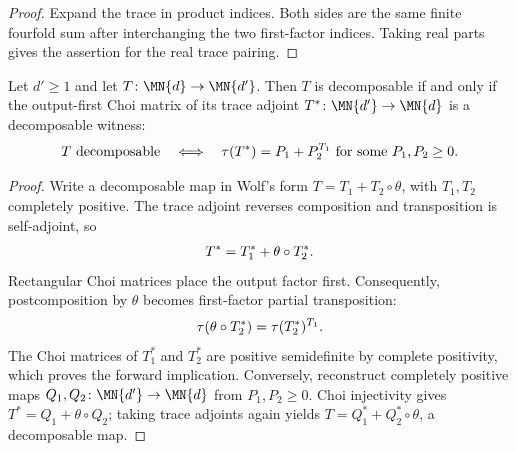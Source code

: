 \begin{proof}
    \leanok
    Expand the trace in product indices.  Both sides are the same finite
    fourfold sum after interchanging the two first-factor indices.  Taking
    real parts gives the assertion for the real trace pairing.
\end{proof}

\begin{theorem}
    \label{thm:decomposable_map_iff_decomposable_witness}
    \leanok
    Let $d'\geq1$ and let $T\colon\MN{d}\to\MN{d'}$. Then $T$ is
    decomposable if and only if the output-first Choi matrix of its trace
    adjoint $T^*\colon\MN{d'}\to\MN{d}$ is a decomposable witness:
    \begin{align}
        T\text{ decomposable}
        \quad\Longleftrightarrow\quad
        \tau(T^*)=P_1+P_2^{T_1}
        \text{ for some }P_1,P_2\geq0.
        \notag
    \end{align}
\end{theorem}

\begin{proof}
    \leanok
    Write a decomposable map in Wolf's form
    $T=T_1+T_2\circ\theta$, with $T_1,T_2$ completely positive. The trace
    adjoint reverses composition and transposition is self-adjoint, so
    \begin{align}
        T^*=T_1^*+\theta\circ T_2^*.
        \notag
    \end{align}
    Rectangular Choi matrices place the output factor first. Consequently,
    postcomposition by $\theta$ becomes first-factor partial transposition:
    \begin{align}
        \tau(\theta\circ T_2^*)=\tau(T_2^*)^{T_1}.
        \notag
    \end{align}
    The Choi matrices of $T_1^*$ and $T_2^*$ are positive semidefinite by
    complete positivity, which proves the forward implication. Conversely,
    reconstruct completely positive maps $Q_1,Q_2\colon\MN{d'}\to\MN{d}$
    from $P_1,P_2\geq0$. Choi injectivity gives
    $T^*=Q_1+\theta\circ Q_2$; taking trace adjoints again yields
    $T=Q_1^*+Q_2^*\circ\theta$, a decomposable map.
\end{proof}

